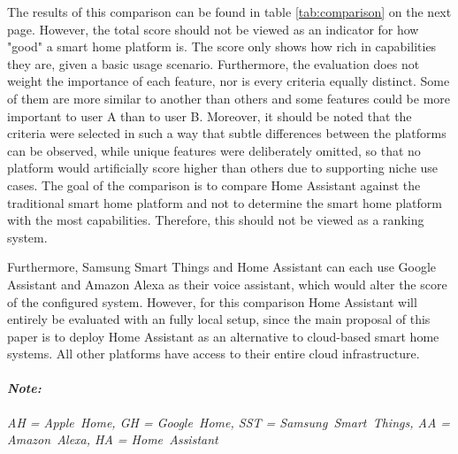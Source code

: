 The results of this comparison can be found in table \ref{tab:comparison} on the next page. However, the total score should not be viewed as an indicator for how "good" a smart home platform is. The score only shows how rich in capabilities they are, given a basic usage scenario. Furthermore, the evaluation does not weight the importance of each feature, nor is every criteria equally distinct. Some of them are more similar to another than others and some features could be more important to user A than to user B. Moreover, it should be noted that the criteria were selected in such a way that subtle differences between the platforms can be observed, while unique features were deliberately omitted, so that no platform would artificially score higher than others due to supporting niche use cases. The goal of the comparison is to compare Home Assistant against the traditional smart home platform and not to determine the smart home platform with the most capabilities. Therefore, this should not be viewed as a ranking system.

Furthermore, Samsung Smart Things and Home Assistant can each use Google Assistant and Amazon Alexa as their voice assistant, which would alter the score of the configured system. However, for this comparison Home Assistant will entirely be evaluated with an fully local setup, since the main proposal of this paper is to deploy Home Assistant as an alternative to cloud-based smart home systems. All other platforms have access to their entire cloud infrastructure.

\noindent
\paragraph{\textit{Note:}}
\textit{AH = Apple~Home, GH = Google~Home, SST = Samsung~Smart~Things, AA = Amazon~Alexa, HA = Home~Assistant}

